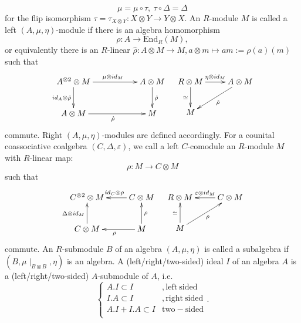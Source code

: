 \documentclass[10pt,a4paper]{article}
\newcommand{\eps}{\varepsilon}
\begin{document}
$$\mu = \mu \circ \tau,\ \tau \circ \Delta = \Delta$$
for the flip isomorphism $\tau = \tau_{X \otimes Y} : X \otimes Y \longrightarrow Y \otimes X$.
An $R$-module $M$ is called a left $(A, \mu, \eta)$-module if there is an algebra homomorphism
$$\rho : A \longrightarrow \mathrm{End}_R(M),$$
or equivalently there is an $R$-linear $\hat{\rho} : A \otimes M \longrightarrow M, a \otimes m \longmapsto a m := \rho(a)(m)$ such that
$$\begin{array}{cc}
\xymatrix{
A^{\otimes2} \otimes M \ar[rr]^{\mu \otimes id_M} \ar[d]_{id_A \otimes \hat{\rho}} && A \otimes M \ar[d]^{\hat{\rho}}\\
A \otimes M \ar[rr]_{\hat{\rho}}& & M\\
} &\xymatrix{
R \otimes M \ar[d]_{\simeq}\ar[r]^{\eta \otimes id_M} & A \otimes M \ar[ld]^{\hat{\rho}}\\
M&\\
}
\end{array}$$
commute. Right $(A, \mu, \eta)$-modules are defined accordingly. For a counital coassociative coalgebra $(C, \Delta, \eps)$, we call a left $C$-comodule an $R$-module $M$ with $R$-linear map:
$$\rho : M \longrightarrow C \otimes M$$
such that
$$\begin{array}{cc}
\xymatrix{
C^{\otimes 2} \otimes M & C \otimes M\ar[l]_{id_C \otimes \rho}\\
C \otimes M\ar[u]^{\Delta \otimes id_M} & M \ar[u]_\rho \ar[l]^\rho\\
} & \xymatrix{
R \otimes M & C \otimes M\ar[l]_{\eps \otimes id_M}\\
M \ar[u]^\simeq \ar[ru]_{\rho} &\\%
}
\end{array}$$
commute. An $R$-submodule $B$ of an algebra $(A, \mu, \eta)$ is called a subalgebra if $(B, \mu\mid_{B \otimes B}, \eta)$ is an algebra. A (left/right/two-sided) ideal $I$ of an algebra $A$ is a (left/right/two-sided) $A$-submodule of $A$, i.e.
$$\begin{cases}
A. I \subset I &, \mathrm{left~sided}\\
I. A \subset I &, \mathrm{right~sided}\\
 A. I + I. A \subset I &\mathrm{two-sided}\\
 \end{cases}.$$
\end{document}
